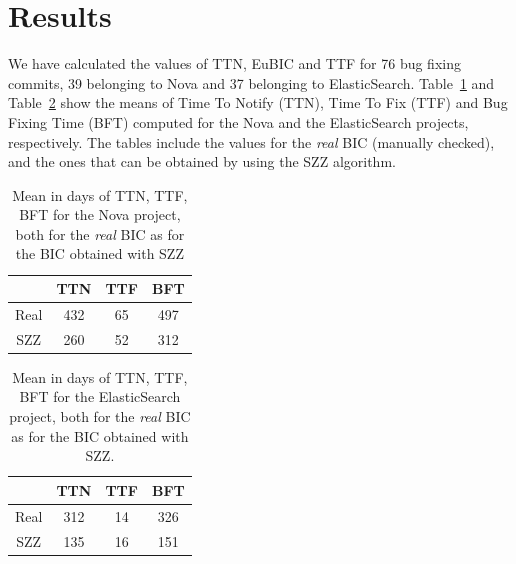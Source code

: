 \documentclass[10pt, conference]{IEEEtran}
\begin{document}
\section{Results}
\label{sec:results}

We have calculated the values of TTN, EuBIC and TTF for 76 bug fixing commits, 39 belonging to Nova and 37 belonging to ElasticSearch. %
Table~\ref{tableNova} and Table~\ref{tableES} show the means of Time To Notify (TTN), Time To Fix (TTF) and Bug Fixing Time (BFT) computed for the Nova and the ElasticSearch projects, respectively. The tables include the values for the \emph{real} BIC (manually checked), and the ones that can be obtained by using the SZZ algorithm.

\begin{table}[!t]
\renewcommand{\arraystretch}{1.3}
\centering
\caption{Mean in days of TTN, TTF, BFT for the Nova project, both for the \emph{real} BIC as for the BIC obtained with SZZ}
\label{tableNova}
\begin{tabular}{|c||c||c||c| }
\hline
  & TTN & TTF & BFT \\
\hline
Real & 432 & 65 & 497 \\
\hline
SZZ & 260 & 52 & 312\\
\hline
\end{tabular}
\end{table}

\begin{table}[!t]
\renewcommand{\arraystretch}{1.3}
\centering
\caption{Mean in days of TTN, TTF, BFT for the ElasticSearch project, both for the \emph{real} BIC as for the BIC obtained with SZZ.}
\label{tableES}
\begin{tabular}{|c||c||c||c| }
\hline
  & TTN & TTF & BFT \\
\hline
Real & 312 & 14 & 326 \\
\hline
SZZ & 135 & 16 & 151\\
\hline
\end{tabular}
\end{table}
\end{document}
